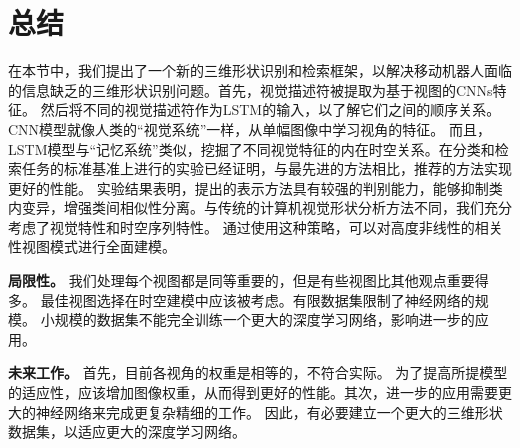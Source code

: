 \section{总结}
在本节中，我们提出了一个新的三维形状识别和检索框架，以解决移动机器人面临的信息缺乏的三维形状识别问题。首先，视觉描述符被提取为基于视图的CNNs特征。 然后将不同的视觉描述符作为LSTM的输入，以了解它们之间的顺序关系。 CNN模型就像人类的“视觉系统”一样，从单幅图像中学习视角的特征。 而且，LSTM模型与“记忆系统”类似，挖掘了不同视觉特征的内在时空关系。在分类和检索任务的标准基准上进行的实验已经证明，与最先进的方法相比，推荐的方法实现更好的性能。 实验结果表明，提出的表示方法具有较强的判别能力，能够抑制类内变异，增强类间相似性分离。与传统的计算机视觉形状分析方法不同，我们充分考虑了视觉特性和时空序列特性。 通过使用这种策略，可以对高度非线性的相关性视图模式进行全面建模。

\textbf{局限性。} 我们处理每个视图都是同等重要的，但是有些视图比其他观点重要得多。 最佳视图选择在时空建模中应该被考虑。有限数据集限制了神经网络的规模。 小规模的数据集不能完全训练一个更大的深度学习网络，影响进一步的应用。

\textbf{未来工作。} 首先，目前各视角的权重是相等的，不符合实际。 为了提高所提模型的适应性，应该增加图像权重，从而得到更好的性能。其次，进一步的应用需要更大的神经网络来完成更复杂精细的工作。 因此，有必要建立一个更大的三维形状数据集，以适应更大的深度学习网络。 
